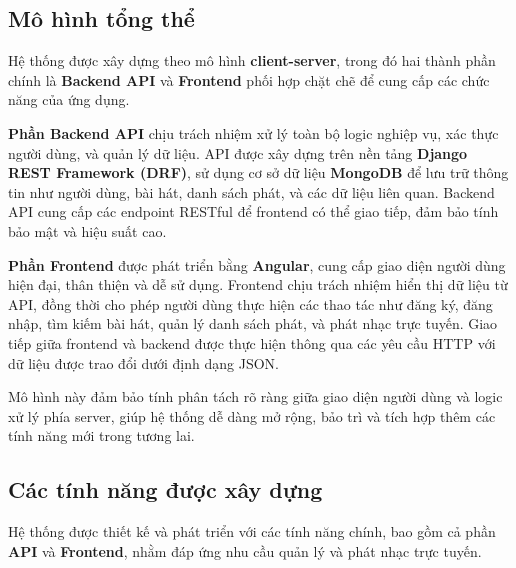 \subsection{Mô hình tổng thể}
Hệ thống được xây dựng theo mô hình \textbf{client-server}, trong đó hai thành phần chính là \textbf{Backend API} và \textbf{Frontend} phối hợp chặt chẽ để cung cấp các chức năng của ứng dụng. 

\textbf{Phần Backend API} chịu trách nhiệm xử lý toàn bộ logic nghiệp vụ, xác thực người dùng, và quản lý dữ liệu. API được xây dựng trên nền tảng \textbf{Django REST Framework (DRF)}, sử dụng cơ sở dữ liệu \textbf{MongoDB} để lưu trữ thông tin như người dùng, bài hát, danh sách phát, và các dữ liệu liên quan. Backend API cung cấp các endpoint RESTful để frontend có thể giao tiếp, đảm bảo tính bảo mật và hiệu suất cao.

\textbf{Phần Frontend} được phát triển bằng \textbf{Angular}, cung cấp giao diện người dùng hiện đại, thân thiện và dễ sử dụng. Frontend chịu trách nhiệm hiển thị dữ liệu từ API, đồng thời cho phép người dùng thực hiện các thao tác như đăng ký, đăng nhập, tìm kiếm bài hát, quản lý danh sách phát, và phát nhạc trực tuyến. Giao tiếp giữa frontend và backend được thực hiện thông qua các yêu cầu HTTP với dữ liệu được trao đổi dưới định dạng JSON.

Mô hình này đảm bảo tính phân tách rõ ràng giữa giao diện người dùng và logic xử lý phía server, giúp hệ thống dễ dàng mở rộng, bảo trì và tích hợp thêm các tính năng mới trong tương lai.

\subsection{Các tính năng được xây dựng}
Hệ thống được thiết kế và phát triển với các tính năng chính, bao gồm cả phần \textbf{API} và \textbf{Frontend}, nhằm đáp ứng nhu cầu quản lý và phát nhạc trực tuyến.


